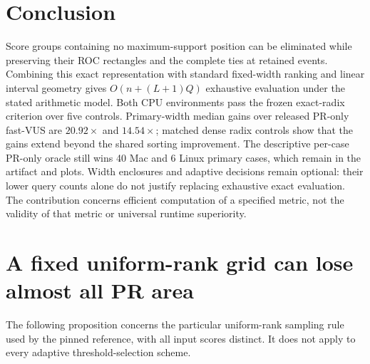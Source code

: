 \documentclass[10pt]{article}
\begin{document}
\section{Conclusion}
Score groups containing no maximum-support position can be eliminated while
preserving their ROC rectangles and the complete ties at retained events.
Combining this exact representation with standard fixed-width ranking and
linear interval geometry gives $O(n+(L+1)Q)$ exhaustive evaluation under the
stated arithmetic model. Both CPU environments pass the frozen exact-radix
criterion over five controls. Primary-width median gains over released
PR-only fast-VUS are $20.92\times$ and $14.54\times$; matched dense radix
controls show that the gains extend beyond the shared sorting improvement.
The descriptive per-case PR-only oracle still wins 40 Mac and 6 Linux
primary cases, which remain in the artifact and plots. Width enclosures
and adaptive decisions remain optional:
their lower query counts alone do not justify replacing exhaustive exact
evaluation. The contribution concerns efficient computation of a specified
metric, not the validity of that metric or universal runtime superiority.

\appendix
\section{A fixed uniform-rank grid can lose almost all PR area}
\label{app:grid}
The following proposition concerns the particular uniform-rank sampling rule
used by the pinned reference, with all input scores distinct. It does not
apply to every adaptive threshold-selection scheme.
\end{document}

